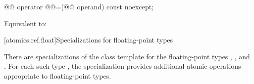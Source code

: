 %
%
%
%
%
\begin{itemdecl}
@@ operator @@=(@@ operand) const noexcept;
\end{itemdecl}

\begin{itemdescr}
\pnum
\effects
Equivalent to:
\end{itemdescr}

[atomics.ref.float]{Specializations for floating-point types}

\pnum
{}%
There are specializations of the  class template
for the floating-point types
,
, and
.
For each such type ,
the specialization  provides
additional atomic operations appropriate to floating-point types.

